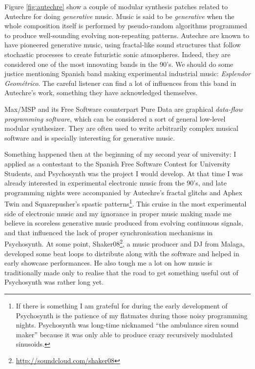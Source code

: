 \begin{mynote}
  Figure \ref{fig:autechre} show a couple of modular synthesis patches
  related to Autechre for doing \emph{generative} music.  Music is
  said to be \emph{generative} when the whole composition itself is
  performed by pseudo-random algorithms programmed to produce
  well-sounding evolving non-repeating patterns. Autechre are known to
  have pioneered generative music, using fractal-like sound structures
  that follow stochastic processes to create futuristic sonic
  atmospheres. Indeed, they are considered one of the most innovating
  bands in the 90's. We should do some justice mentioning Spanish band
  making experimental industrial music: \emph{Esplendor Geométrico}. The
  careful listener can find a lot of influences from this band in
  Autechre's work, something they have acknowledged themselves.

  Max/MSP and its Free Software counterpart Pure
  Data
  are graphical \emph{data-flow programming software}, which can be considered a sort of general low-level
  modular synthesizer. They are often used to write arbitrarily
  complex musical software and is specially interesting for generative
  music.
\end{mynote}

Something happened then at the beginning of my second year of
university: I applied as a contestant to the Spanish Free Software
Contest for University Students, and Psychosynth was the project I
would develop. At that time I was already interested in experimental
electronic music from the 90's, and late programming nights were
accompanied by Autechre's fractal glitchs and Aphex Twin and
Squarepusher's spastic patterns\footnote{If there is something I am
  grateful for during the early development of Psychosynth is the
  patience of my flatmates during those noisy programming
  nights. Psychosynth was long-time nicknamed ``the ambulance siren
  sound maker'' because it was only able to produce crazy recursively
  modulated sinusoids.}. This cruise in the most experimental side of
electronic music and my ignorance in proper music making made me
believe in scoreless generative music produced from evolving
continuous signals, and that influenced the lack of proper
synchronisation mechanisms in Psychosynth. At some point,
Shaker08\footnote{\url{http://soundcloud.com/shaker08}}, a music
producer and DJ from Malaga, developed some beat loops to distribute
along with the software and helped in early showcase performances. He
also tough me a lot on how music is traditionally made only to realise
that the road to get something useful out of Psychosynth was rather
long yet.


